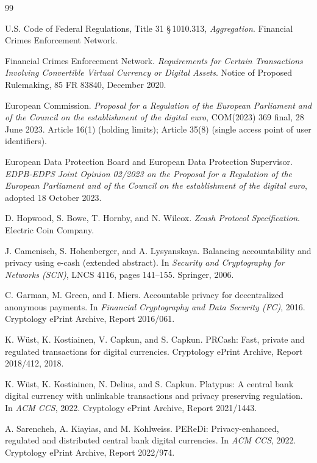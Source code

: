 \documentclass[11pt,a4paper]{article}
\theoremstyle{definition}
\theoremstyle{plain}
\theoremstyle{remark}
\begin{document}
\begin{thebibliography}{99}

U.S. Code of Federal Regulations, Title 31 \S\,1010.313, \emph{Aggregation}. Financial Crimes Enforcement Network.

Financial Crimes Enforcement Network. \emph{Requirements for Certain Transactions Involving Convertible Virtual Currency or Digital Assets}. Notice of Proposed Rulemaking, 85 FR 83840, December 2020.

European Commission. \emph{Proposal for a Regulation of the European Parliament and of the Council on the establishment of the digital euro}, COM(2023) 369 final, 28 June 2023. Article 16(1) (holding limits); Article 35(8) (single access point of user identifiers).

European Data Protection Board and European Data Protection Supervisor. \emph{EDPB-EDPS Joint Opinion 02/2023 on the Proposal for a Regulation of the European Parliament and of the Council on the establishment of the digital euro}, adopted 18 October 2023.

D. Hopwood, S. Bowe, T. Hornby, and N. Wilcox. \emph{Zcash Protocol Specification}. Electric Coin Company.

J. Camenisch, S. Hohenberger, and A. Lysyanskaya. Balancing accountability and privacy using e-cash (extended abstract). In \emph{Security and Cryptography for Networks (SCN)}, LNCS 4116, pages 141--155. Springer, 2006.

C. Garman, M. Green, and I. Miers. Accountable privacy for decentralized anonymous payments. In \emph{Financial Cryptography and Data Security (FC)}, 2016. Cryptology ePrint Archive, Report 2016/061.

K. W\"ust, K. Kostiainen, V. Capkun, and S. Capkun. PRCash: Fast, private and regulated transactions for digital currencies. Cryptology ePrint Archive, Report 2018/412, 2018.

K. W\"ust, K. Kostiainen, N. Delius, and S. Capkun. Platypus: A central bank digital currency with unlinkable transactions and privacy preserving regulation. In \emph{ACM CCS}, 2022. Cryptology ePrint Archive, Report 2021/1443.

A. Sarencheh, A. Kiayias, and M. Kohlweiss. PEReDi: Privacy-enhanced, regulated and distributed central bank digital currencies. In \emph{ACM CCS}, 2022. Cryptology ePrint Archive, Report 2022/974.


\end{thebibliography}
\end{document}

